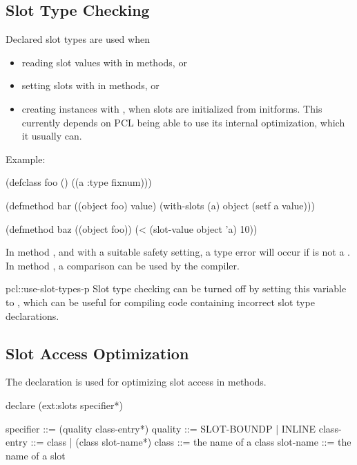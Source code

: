 \subsection{Slot Type Checking}

Declared slot types are used when 

\begin{itemize}
\item reading slot values with  in methods, or

\item setting slots with  in methods, or 
  
\item creating instances with , when slots are
  initialized from initforms.  This currently depends on PCL being
  able to use its internal  optimization, which it
  usually can.
\end{itemize}

Example:

\begin{example}
(defclass foo ()
  ((a :type fixnum)))

(defmethod bar ((object foo) value)
  (with-slots (a) object
    (setf a value)))

(defmethod baz ((object foo))
  (< (slot-value object 'a) 10))
\end{example}

In method , and with a suitable safety setting, a type error
will occur if  is not a .  In method
, a  comparison can be used by the compiler.
  
\begin{defvar}{pcl::}{use-slot-types-p}
  Slot type checking can be turned off by setting this variable to
  \false, which can be useful for compiling code containing incorrect
  slot type declarations.
\end{defvar}


\subsection{Slot Access Optimization}

The declaration  is used for optimizing slot access in
methods.

\begin{example}
declare (ext:slots specifier*)

specifier   ::= (quality class-entry*)
quality     ::= SLOT-BOUNDP | INLINE
class-entry ::= class | (class slot-name*)
class       ::= the name of a class
slot-name   ::= the name of a slot
\end{example}

